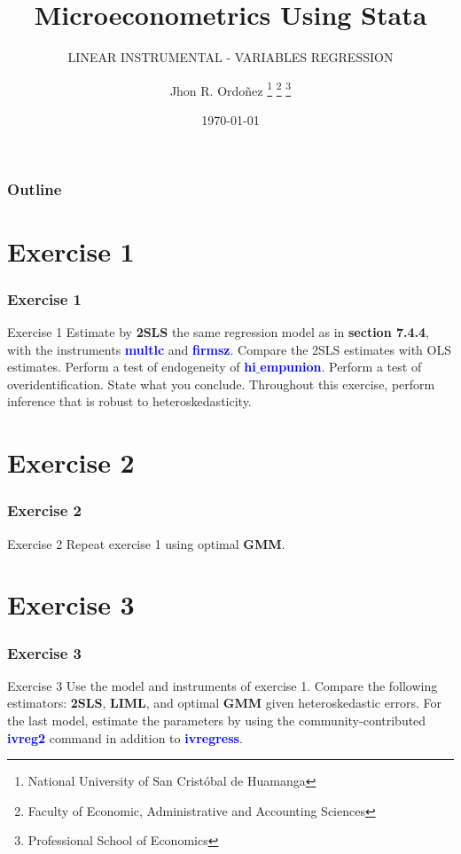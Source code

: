 \documentclass[10pt, aspectratio=169]{beamer}
\title{Microeconometrics Using Stata}
\subtitle{LINEAR INSTRUMENTAL - VARIABLES REGRESSION}
\author{
		Jhon R. Ordoñez
		\footnote{\label{1} National University of San Cristóbal de Huamanga}
		\footnote{\label{2} Faculty of Economic, Administrative and Accounting Sciences}
		\footnote{\label{3} Professional School of Economics}
	}
\date{\today}
\begin{document}
	\begin{frame}
		\maketitle
	\end{frame}
	\begin{frame}[t]
		\frametitle{Outline}
		\tableofcontents
	\end{frame}
	\section{Exercise 1}
		\begin{frame}
			\frametitle{Exercise 1}
				\begin{block}{Exercise 1}
					Estimate by \textbf{2SLS} the same regression model as in \textcolor{red!50}{\textbf{section 7.4.4}}, with the
					instruments \textcolor{blue}{\textbf{multlc}} and \textcolor{blue}{\textbf{firmsz}}. Compare the 2SLS estimates with OLS
					estimates. Perform a test of endogeneity of \textcolor{blue}{\textbf{hi$\_$empunion}}. Perform a test of
					overidentification. State what you conclude. Throughout this exercise,
					perform inference that is robust to heteroskedasticity.
				\end{block}
		\end{frame}
	\section{Exercise 2}
		\begin{frame}
			\frametitle{Exercise 2}
			\begin{block}{Exercise 2}
				Repeat exercise 1 using optimal \textbf{GMM}.
			\end{block}
		\end{frame}
	\section{Exercise 3}
		\begin{frame}
			\frametitle{Exercise 3}
			\begin{block}{Exercise 3}
				Use the model and instruments of exercise 1. Compare the following
				estimators: \textbf{2SLS}, \textbf{LIML}, and optimal \textbf{GMM }given heteroskedastic errors. For the
				last model, estimate the parameters by using the community-contributed
				\textcolor{blue}{\textbf{ivreg2}} command in addition to \textcolor{blue}{\textbf{ivregress}}.
			\end{block}
		\end{frame}
\end{document}
